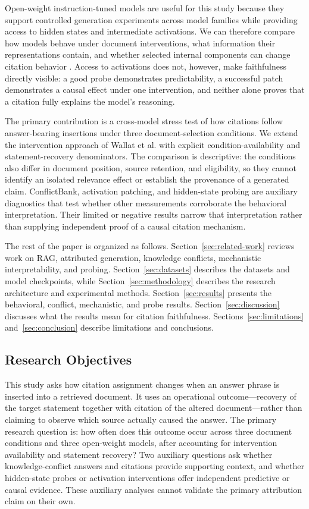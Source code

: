 \documentclass[a4paper,fleqn]{cas-sc}
\begin{document}
Open-weight instruction-tuned models are useful for this study because they support controlled generation experiments across model families while providing access to hidden states and intermediate activations. We can therefore compare how models behave under document interventions, what information their representations contain, and whether selected internal components can change citation behavior \cite{leon2025gpt}. Access to activations does not, however, make faithfulness directly visible: a good probe demonstrates predictability, a successful patch demonstrates a causal effect under one intervention, and neither alone proves that a citation fully explains the model's reasoning.

The primary contribution is a cross-model stress test of how citations follow answer-bearing insertions under three document-selection conditions. We extend the intervention approach of Wallat et al. \cite{wallat2025correctness} with explicit condition-availability and statement-recovery denominators. The comparison is descriptive: the conditions also differ in document position, source retention, and eligibility, so they cannot identify an isolated relevance effect or establish the provenance of a generated claim. ConflictBank, activation patching, and hidden-state probing are auxiliary diagnostics that test whether other measurements corroborate the behavioral interpretation. Their limited or negative results narrow that interpretation rather than supplying independent proof of a causal citation mechanism.

The rest of the paper is organized as follows. Section~\ref{sec:related-work} reviews work on RAG, attributed generation, knowledge conflicts, mechanistic interpretability, and probing. Section~\ref{sec:datasets} describes the datasets and model checkpoints, while Section~\ref{sec:methodology} describes the research architecture and experimental methods. Section~\ref{sec:results} presents the behavioral, conflict, mechanistic, and probe results. Section~\ref{sec:discussion} discusses what the results mean for citation faithfulness. Sections~\ref{sec:limitations} and~\ref{sec:conclusion} describe limitations and conclusions.

\subsection{Research Objectives}
\label{subsec:objectives}

\color{blue}
This study asks how citation assignment changes when an answer phrase is inserted into a retrieved document. It uses an operational outcome---recovery of the target statement together with citation of the altered document---rather than claiming to observe which source actually caused the answer. The primary research question is: how often does this outcome occur across three document conditions and three open-weight models, after accounting for intervention availability and statement recovery? Two auxiliary questions ask whether knowledge-conflict answers and citations provide supporting context, and whether hidden-state probes or activation interventions offer independent predictive or causal evidence. These auxiliary analyses cannot validate the primary attribution claim on their own.
\color{black}
\end{document}
